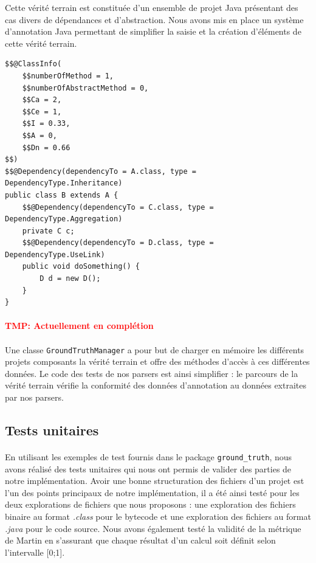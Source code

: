 \documentclass{scrartcl}
\newcommand{\TODO}[1] {
    \noindent \paragraph{\textcolor{red}{#1}}
}
\begin{document}
    Cette vérité terrain est constituée d’un ensemble de projet Java présentant des cas divers de dépendances et d'abstraction. Nous avons mis en place un système d’annotation Java permettant de simplifier la saisie et la création d'éléments de cette vérité terrain.
    
\begin{lstlisting}[caption={Exemple de classe annotée}]
$$@ClassInfo(
    $$numberOfMethod = 1,
    $$numberOfAbstractMethod = 0,
    $$Ca = 2,
    $$Ce = 1,
    $$I = 0.33,
    $$A = 0,
    $$Dn = 0.66
$$)
$$@Dependency(dependencyTo = A.class, type = DependencyType.Inheritance)
public class B extends A { 
    $$@Dependency(dependencyTo = C.class, type = DependencyType.Aggregation)
    private C c;
    $$@Dependency(dependencyTo = D.class, type = DependencyType.UseLink)
    public void doSomething() {
        D d = new D();
    }
}
\end{lstlisting}
    \TODO{TMP: Actuellement en complétion}
    
    \paragraph{}Une classe \texttt{GroundTruthManager} a pour but de charger en mémoire les différents projets composants la vérité terrain et offre des méthodes d'accès à ces différentes données. Le code des tests de nos parsers est ainsi simplifier : le parcours de la vérité terrain vérifie la conformité des données d'annotation au données extraites par nos parsers.

\subsection{Tests unitaires}
    \paragraph{}En utilisant les exemples de test fournis dans le package \texttt{ground\_truth}, nous avons réalisé des tests unitaires qui nous ont permis de valider des parties de notre implémentation. Avoir une bonne structuration des fichiers d'un projet est l'un des points principaux de notre implémentation, il a été ainsi testé pour les deux explorations de fichiers que nous proposons : une exploration des fichiers binaire au format \emph{.class} pour le bytecode et une exploration des fichiers au format \emph{.java} pour le code source. Nous avons également testé la validité de la métrique de Martin en s'assurant que chaque résultat d'un calcul soit définit selon l'intervalle [0;1].
\end{document}
